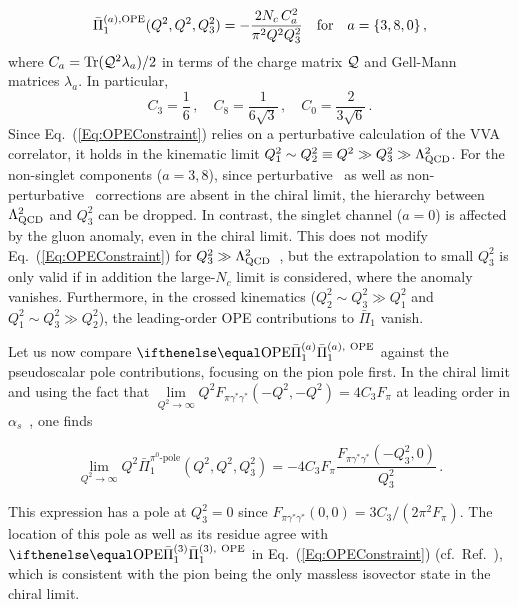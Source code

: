 \begin{equation}
\bar{\Pi}_1^{(a), {\rm OPE}}(Q^2, Q^2, Q_3^2) = -\frac{2 N_c \,C_a^2}{\pi^2 Q^2 Q_3^2}\quad {\rm for} \quad  a=\{3,8,0\}\,,
\label{Eq:OPEConstraint}
\end{equation}
where $C_a = \operatorname{Tr}(\mathcal{Q}^2 \lambda_a)/2$ in terms of the charge matrix $\mathcal{Q}$  and Gell-Mann matrices $\lambda_a$. In particular,
\begin{equation}
C_3 = \frac{1}{6}\, ,\quad C_8 = \frac{1}{6\sqrt{3}}\, ,\quad C_0 = \frac{2}{3\sqrt{6}}\,.
\label{Eq:Ca}
\end{equation}
Since Eq.~(\ref{Eq:OPEConstraint}) relies on a perturbative calculation of the VVA correlator, it holds in the kinematic limit $Q_1^2 \sim Q_2^2 \equiv Q^2 \gg Q_3^2 \gg \Lambda_\text{QCD}^2$. For the non-singlet components ($a=3,8$), since perturbative~\cite{Adler:1969er} as well as non-perturbative~\cite{tHooft:1979rat, Witten:1983tw} corrections are absent in the chiral limit, the hierarchy between $\Lambda_\text{QCD}^2$ and $Q_3^2$ can be dropped. In contrast, the singlet channel ($a=0$) is affected by the gluon anomaly, even in the chiral limit. This does not modify Eq.~(\ref{Eq:OPEConstraint}) for $Q_3^2 \gg \Lambda_\text{QCD}^2$~\cite{BernSDCLong}, but the extrapolation to small $Q_3^2$ is only valid if in addition the large-$N_c$ limit is considered, where the anomaly vanishes. Furthermore, in the crossed kinematics ($Q_2^2 \sim Q_3^2 \gg Q_1^2$ and $Q_1^2 \sim Q_3^2 \gg Q_2^2$), the leading-order OPE contributions to $\bar{\Pi}_1$ vanish.

Let us now compare $\PiPS[\text{OPE}]$ against the pseudoscalar pole contributions, focusing on the pion pole first. In the chiral limit and using the fact that $\lim\limits_{Q^2\to\infty} Q^2 F_{\pi\gamma^*\gamma^*}(-Q^2, -Q^2) = 4 C_3 F_\pi$ at leading order in $\alpha_s$~\cite{Novikov:1983jt,Manohar:1990hu}, one finds
\begin{minipage}{\columnwidth}
\begin{equation}
\lim\limits_{Q^2 \to \infty} Q^2 \bar{\Pi}_1^\text{$\pi^0$-pole}(Q^2, Q^2, Q_3^2) = -4 C_3 F_\pi \frac{F_{\pi\gamma^*\gamma^*}(-Q_3^2, 0)}{Q_3^2}\, .
\end{equation}
\end{minipage}
This expression has a pole at $Q_3^2 = 0$ since $F_{\pi\gamma^*\gamma^*}(0, 0) = 3 C_3 / (2\pi^2 F_\pi)$. The location of this pole as well as its residue agree with $\Pipion[\text{OPE}]$ in Eq.~(\ref{Eq:OPEConstraint}) (cf.~Ref.~\cite{MV}), which is consistent with the pion being the only massless isovector state in the chiral limit.

